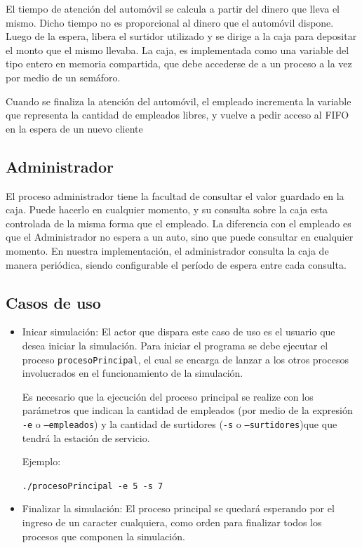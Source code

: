 \documentclass[12pt,a4paper,spanish]{article}
\begin{document}
		El tiempo de atención del automóvil se calcula a partir del dinero que lleva el mismo. Dicho tiempo no es
		proporcional al dinero que el automóvil dispone. Luego de la espera, libera el surtidor utilizado y se dirige
		a la caja para depositar el monto que el mismo llevaba. La caja, es implementada como una variable del tipo entero
		en memoria compartida, que debe accederse de a un proceso a la vez por medio de un semáforo.

		Cuando se finaliza la atención del automóvil, el empleado incrementa la variable que representa la cantidad
		de empleados libres, y vuelve a pedir acceso al FIFO en la espera de un nuevo cliente
	
	\subsection{Administrador}
	
	El proceso administrador tiene la facultad de consultar el valor guardado en la caja. Puede hacerlo en cualquier momento, y su consulta sobre la caja esta controlada de la misma forma que el empleado. La diferencia con el empleado es que el Administrador no espera a un auto, sino que puede consultar en cualquier momento. En nuestra implementación, 
	el administrador consulta la caja de manera periódica, siendo configurable el período de espera entre cada consulta.

\subsection{Casos de uso}

\begin{itemize}
	\item Inicar simulación: El actor que dispara este caso de uso es el usuario
	que desea iniciar la simulación. Para iniciar el programa se debe ejecutar el
	proceso \texttt{procesoPrincipal}, el cual se encarga de
	lanzar a los otros procesos involucrados en el funcionamiento de la simulación.

	Es necesario que la ejecución del proceso principal se realize con los parámetros
	que indican la cantidad de empleados (por medio de la expresión \texttt{-e} o \texttt{--empleados})
	y la cantidad de surtidores (\texttt{-s} o \texttt{--surtidores})que que tendrá la
	estación de servicio.

	Ejemplo:

	\texttt{./procesoPrincipal -e 5 -s 7}

	\item Finalizar la simulación: El proceso principal se quedará esperando por el 
	ingreso de un caracter cualquiera, como orden para finalizar todos los procesos
	que componen la simulación.

\end{itemize}
\end{document}
